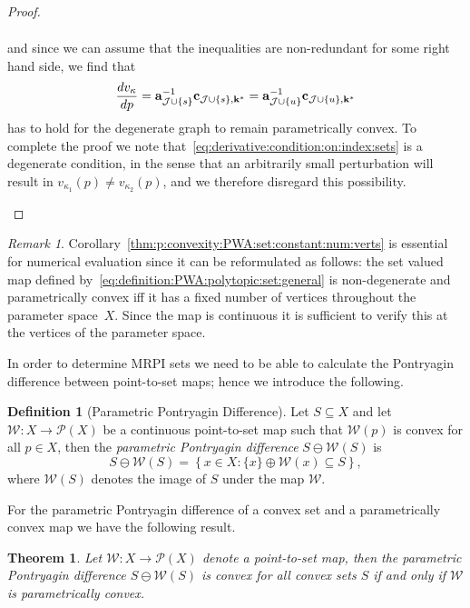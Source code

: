 \documentclass[journal]{IEEEtran}
\newcounter{thmcount}
\newtheorem{thm}[thmcount]{Theorem}
\theoremstyle{remark}
\newtheorem{rem}[thmcount]{Remark}
\theoremstyle{definition}
\newtheorem{defi}[thmcount]{Definition}
\begin{document}
\begin{proof}
\begin{enumerate}
\begin{align*}
\end{align*}
%
and since we can assume that the inequalities are non-redundant for some right hand side, we find that 
%
\begin{equation}\label{eq:derivative:condition:on:index:sets}
  \frac{dv_\kappa}{dp} = {\bf{a}}_{\mathcal J\cup \{s\}}^{-1}{\bf{c}}_{\mathcal J\cup \{s\},{\bf{k}}^\ast} = 
  {\bf{a}}_{\mathcal J\cup \{u\}}^{-1}{\bf{c}}_{\mathcal J\cup \{u\},{\bf{k}}^\ast}
\end{equation}
%
has to hold for the degenerate graph to remain parametrically convex.
%
To complete the proof we note that~\eqref{eq:derivative:condition:on:index:sets} is a degenerate condition, in the sense that an arbitrarily small perturbation will result in $v_{\kappa_1}(p) \neq v_{\kappa_2}(p)$, and we therefore disregard this possibility.
\end{enumerate}
\baselineskip
\end{proof}
%
\begin{rem}
Corollary~\ref{thm:p:convexity:PWA:set:constant:num:verts} is essential for numerical evaluation since it can be reformulated as follows:
%
the set valued map defined by~\eqref{eq:definition:PWA:polytopic:set:general} is non-degenerate and parametrically convex iff 
it has a fixed number of vertices throughout the parameter space~$X$.
%
Since the map is continuous it is sufficient to verify this at the vertices of the parameter space.
%
\end{rem}
%
In order to determine MRPI sets we need to be able to calculate the Pontryagin difference between point-to-set maps; hence we introduce the following.
%
\begin{defi}[Parametric Pontryagin Difference]\label{def:parametric:pontryagin:difference}
  Let $S\subseteq X$ and let $\mathcal W:X\to\mathscr P(X)$ be a continuous point-to-set map such that
  $\mathcal W(p)$ is convex for all $p\in X$, then the \emph{parametric Pontryagin difference} 
  $S\ominus \mathcal W(S)$ is 
%
  \begin{equation}\label{eq:definition:parametric:pontryagin:difference}
    S\ominus \mathcal W(S) = \left\{x\in X: \{x\} \oplus \mathcal W(x)\subseteq S\right\},
  \end{equation}
%
  where $\mathcal W(S)$ denotes the image of $S$ under the map $\mathcal W$. 
\end{defi}
%
For the parametric Pontryagin difference of a convex set and a parametrically convex map we 
have the following result.
%
\begin{thm}\label{thm:convexity:of:pontryagin:difference}
Let $\mathcal W: X\rightarrow\mathscr P(X)$ denote a point-to-set map, then the parametric Pontryagin difference $S \ominus \mathcal W(S)$ is convex for all convex sets $S$ if and only if $\mathcal W$ is parametrically convex.
\end{thm}
\end{document}
